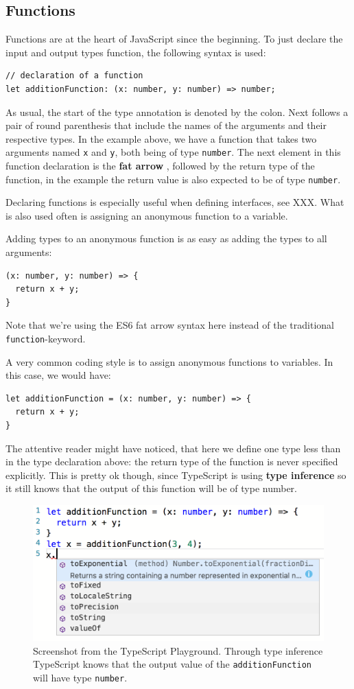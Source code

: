 \documentclass[12pt,a4paper]{report}
\newcommand{\code}[1]{\fbox{\texttt{#1}}}
\begin{document}
\subsection{Functions}
Functions are at the heart of JavaScript since the beginning. To just declare the input and output types function, the following syntax is used:
\begin{lstlisting}
// declaration of a function
let additionFunction: (x: number, y: number) => number;
\end{lstlisting}
As usual, the start of the type annotation is denoted by the colon. Next follows a pair of round parenthesis that include the names of the arguments and their respective types. In the example above, we have a function that takes two arguments named \texttt{x} and \texttt{y}, both being of type \texttt{number}. The next element in this function declaration is the \textbf{fat arrow} \code{=>}, followed by the return type of the function, in the example the return value is also expected to be of type \texttt{number}.

Declaring functions is especially useful when defining interfaces, see XXX. What is also used often is assigning an anonymous function to a variable.

Adding types to an anonymous function is as easy as adding the types to all arguments:
\begin{lstlisting}
(x: number, y: number) => {
  return x + y;
}
\end{lstlisting}
Note that we're using the ES6 fat arrow syntax here instead of the traditional \texttt{function}-keyword.

A very common coding style is to assign anonymous functions to variables. In this case, we would have:
\begin{lstlisting}
let additionFunction = (x: number, y: number) => {
  return x + y;
}
\end{lstlisting}

The attentive reader might have noticed, that here we define one type less than in the type declaration above: the return type of the function is never specified explicitly. This is pretty ok though, since TypeScript is using \textbf{type inference} so it still knows that the output of this function will be of type number.

\begin{figure}
\centering
\includegraphics[scale=0.7]{figures/typeinference.png}
\caption{Screenshot from the TypeScript Playground. Through type inference TypeScript knows that the output value of the \texttt{additionFunction} will have type \texttt{number}.}
\end{figure}
\end{document}

